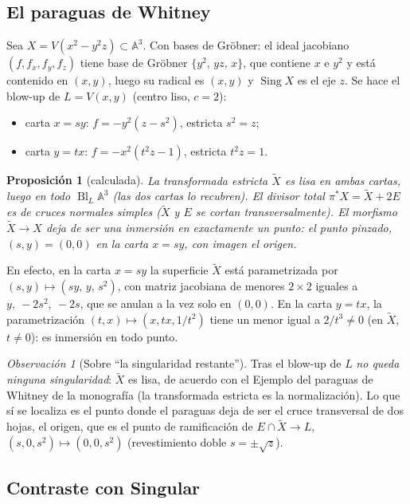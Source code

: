 \documentclass[11pt,a4paper]{article}
\newcommand{\Bl}{\operatorname{Bl}}
\newcommand{\Sing}{\operatorname{Sing}}
\newcommand{\A}{\mathbb{A}}
\theoremstyle{plain}
\newtheorem{proposicion}[teorema]{Proposición}
\theoremstyle{definition}
\theoremstyle{remark}
\newtheorem{observacion}[teorema]{Observación}
\newcommand{\fragmento}[3]{\VerbatimInput[fontsize=\footnotesize,frame=single,framesep=2mm,firstline=#2,lastline=#3]{#1}}
\begin{document}
\fragmento{codigo/simbolico/06_delta.py}{100}{125}

\subsection{El paraguas de Whitney}\label{sec:whitney}

Sea $X=V(x^2-y^2z)\subset\A^3$. Con bases de Gröbner: el ideal jacobiano $(f,f_x,f_y,f_z)$ tiene base de Gröbner $\{y^2,\,yz,\,x\}$, que contiene $x$ e $y^2$ y está contenido en $(x,y)$, luego su radical es $(x,y)$ y $\Sing X$ es el eje $z$. Se hace el blow-up de $L=V(x,y)$ (centro liso, $c=2$):
\begin{itemize}
\item carta $x=sy$: $f=-y^2(z-s^2)$, estricta $s^2=z$;
\item carta $y=tx$: $f=-x^2(t^2z-1)$, estricta $t^2z=1$.
\end{itemize}

\begin{proposicion}[calculada]
La transformada estricta $\tilde X$ es \emph{lisa} en ambas cartas, luego en todo $\Bl_L\A^3$ (las dos cartas lo recubren). El divisor total $\pi^*X=\tilde X+2E$ es de cruces normales simples ($\tilde X$ y $E$ se cortan transversalmente). El morfismo $\tilde X\to X$ deja de ser una inmersión en exactamente un punto: el \emph{punto pinzado}, $(s,y)=(0,0)$ en la carta $x=sy$, con imagen el origen.
\end{proposicion}

En efecto, en la carta $x=sy$ la superficie $\tilde X$ está parametrizada por $(s,y)\mapsto(sy,\,y,\,s^2)$, con matriz jacobiana de menores $2\times2$ iguales a $y,\ -2s^2,\ -2s$, que se anulan a la vez solo en $(0,0)$. En la carta $y=tx$, la parametrización $(t,x)\mapsto(x,tx,1/t^2)$ tiene un menor igual a $2/t^3\ne0$ (en $\tilde X$, $t\ne0$): es inmersión en todo punto.

\begin{observacion}[Sobre ``la singularidad restante'']
Tras el blow-up de $L$ \emph{no queda ninguna singularidad}: $\tilde X$ es lisa, de acuerdo con el Ejemplo del paraguas de Whitney de la monografía (la transformada estricta es la normalización). Lo que sí se localiza es el punto donde el paraguas deja de ser el cruce transversal de dos hojas, el origen, que es el punto de ramificación de $E\cap\tilde X\to L$, $(s,0,s^2)\mapsto(0,0,s^2)$ (revestimiento doble $s=\pm\sqrt z$).
\end{observacion}

\subsection{Contraste con Singular}\label{sec:singular}
\end{document}
